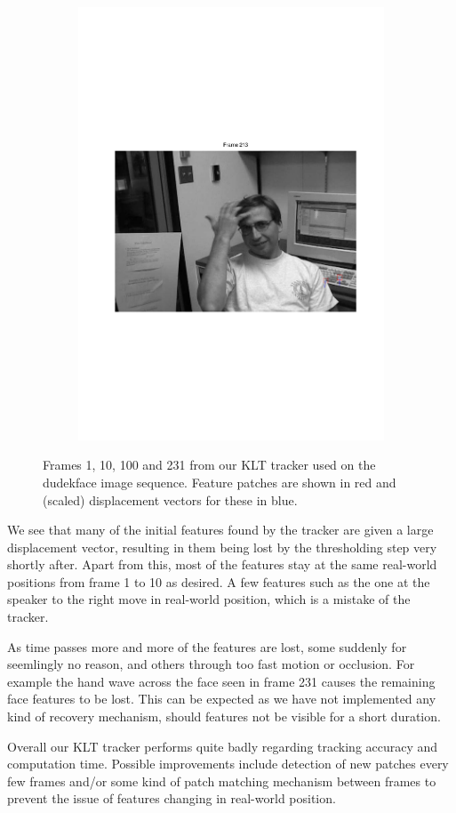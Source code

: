 \documentclass[11pt,a4paper]{article}
\begin{document}
\begin{figure}
\begin{subfigure}{0.45\textwidth}
\includegraphics[scale=0.4,trim={70 250 90 250}]{img/tracker_dudekface_213.pdf}
\end{subfigure}
\caption{Frames 1, 10, 100 and 231 from our KLT tracker used on the dudekface image sequence. Feature patches are shown in red and (scaled) displacement vectors for these in blue.}
\label{fig:tracker_dudekface}
\end{figure}

We see that many of the initial features found by the tracker are given a large displacement vector, resulting in them being lost by the thresholding step very shortly after. Apart from this, most of the features stay at the same real-world positions from frame 1 to 10 as desired. A few features such as the one at the speaker to the right move in real-world position, which is a mistake of the tracker.

As time passes more and more of the features are lost, some suddenly for seemlingly no reason, and others through too fast motion or occlusion. For example the hand wave across the face seen in frame 231 causes the remaining face features to be lost. This can be expected as we have not implemented any kind of recovery mechanism, should features not be visible for a short duration.

Overall our KLT tracker performs quite badly regarding tracking accuracy and computation time. Possible improvements include detection of new patches every few frames and/or some kind of patch matching mechanism between frames to prevent the issue of features changing in real-world position.
%
\end{document}
